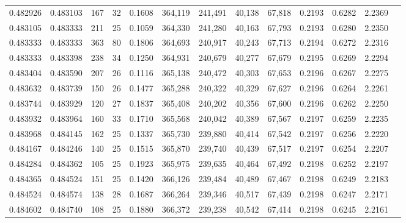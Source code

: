 \begin{tabular}{rrrrrrrrrrrrr}
0.482926 & 0.483103 &    167 &    32 &                                     0.1608 & 364,119 & 241,491 &  40,138 &  67,818 & 0.2193 & 0.6282 & 2.2369 \\
0.483105 & 0.483333 &    211 &    25 &                                     0.1059 & 364,330 & 241,280 &  40,163 &  67,793 & 0.2193 & 0.6280 & 2.2350 \\
0.483333 & 0.483333 &    363 &    80 &                                     0.1806 & 364,693 & 240,917 &  40,243 &  67,713 & 0.2194 & 0.6272 & 2.2316 \\
0.483333 & 0.483398 &    238 &    34 &                                     0.1250 & 364,931 & 240,679 &  40,277 &  67,679 & 0.2195 & 0.6269 & 2.2294 \\
0.483404 & 0.483590 &    207 &    26 &                                     0.1116 & 365,138 & 240,472 &  40,303 &  67,653 & 0.2196 & 0.6267 & 2.2275 \\
0.483632 & 0.483739 &    150 &    26 &                                     0.1477 & 365,288 & 240,322 &  40,329 &  67,627 & 0.2196 & 0.6264 & 2.2261 \\
0.483744 & 0.483929 &    120 &    27 &                                     0.1837 & 365,408 & 240,202 &  40,356 &  67,600 & 0.2196 & 0.6262 & 2.2250 \\
0.483932 & 0.483964 &    160 &    33 &                                     0.1710 & 365,568 & 240,042 &  40,389 &  67,567 & 0.2197 & 0.6259 & 2.2235 \\
0.483968 & 0.484145 &    162 &    25 &                                     0.1337 & 365,730 & 239,880 &  40,414 &  67,542 & 0.2197 & 0.6256 & 2.2220 \\
0.484167 & 0.484246 &    140 &    25 &                                     0.1515 & 365,870 & 239,740 &  40,439 &  67,517 & 0.2197 & 0.6254 & 2.2207 \\
0.484284 & 0.484362 &    105 &    25 &                                     0.1923 & 365,975 & 239,635 &  40,464 &  67,492 & 0.2198 & 0.6252 & 2.2197 \\
0.484365 & 0.484524 &    151 &    25 &                                     0.1420 & 366,126 & 239,484 &  40,489 &  67,467 & 0.2198 & 0.6249 & 2.2183 \\
0.484524 & 0.484574 &    138 &    28 &                                     0.1687 & 366,264 & 239,346 &  40,517 &  67,439 & 0.2198 & 0.6247 & 2.2171 \\
0.484602 & 0.484740 &    108 &    25 &                                     0.1880 & 366,372 & 239,238 &  40,542 &  67,414 & 0.2198 & 0.6245 & 2.2161 \\

\end{tabular}
